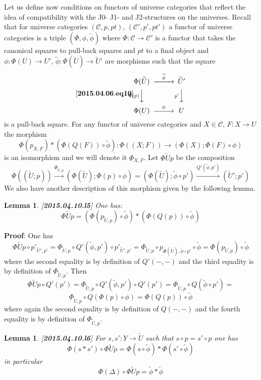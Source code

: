 \documentclass[12pt]{article}
\newenvironment{eq}{\begin{equation}}{\end{equation}}
\newenvironment{myproof}{{\bf Proof}:}{\vskip 5mm }
\newtheorem{lemma}[proposition]{Lemma}
\newcommand{\llabel}[1]{\label{#1}[{\bf #1}]}
\newcommand{\sr}{\rightarrow}
\newcommand{\lr}{\longrightarrow}
\newcommand{\wt}{\widetilde}
\begin{document}
Let us define now conditions on functors of universe categories that reflect the idea of compatibility with the J0- J1- and J2-structures on the universes. Recall that for universe categories $({\mathcal C},p,pt)$, $({\mathcal C}',p',pt')$ a functor of universe categories is a triple $(\Phi,\phi,\wt{\phi})$ where $\Phi:{\mathcal C}\sr {\mathcal C}'$ is a functor that takes the canonical squares to pull-back squares and $pt$ to a final object and $\phi:\Phi(U)\sr U'$, $\wt{\phi}:\Phi(\wt{U})\sr \wt{U}'$ are morphisms such that the square
%
\begin{eq}\llabel{2015.04.06.eq10}
\begin{CD}
\Phi(\wt{U}) @>\wt{\phi}>> \wt{U}'\\
@V\Phi(p) VV @Vp' VV\\
\Phi(U) @>\phi>> U
\end{CD}
\end{eq}
%
is a pull-back square. For any functor of universe categories and $X\in{\mathcal C}$, $F:X\sr U$ the morphism
%
$$\Phi(p_{X,F})*(\Phi(Q(F))\circ\wt{\phi}):\Phi((X;F))\sr (\Phi(X);\Phi(F)\circ\phi)$$
%
is an isomorphism and we will denote it $\Phi_{X,F}$. Let $\Phi\wt{U}p$ be the composition
%
$$\Phi((\wt{U};p)) \stackrel{\Phi_{\wt{U},p}}{\lr} (\Phi(\wt{U});\Phi(p)\circ \phi)=(\Phi(\wt{U});\wt{\phi}\circ p')\stackrel{Q'(\wt{\phi},p')}{\lr} (\wt{U}';p')$$
%
We also have another description of this morphism given by the following lemma.
%
\begin{lemma}
\llabel{2015.04.10.l5}
One has:
%
$$\Phi\wt{U}p=(\Phi(p_{\wt{U},p})\circ\wt{\phi})*(\Phi(Q(p))\circ\wt{\phi})$$
%
\end{lemma}
%
\begin{myproof}
One has
%
$$\Phi\wt{U}p\circ p'_{\wt{U}',p'}=\Phi_{\wt{U},p}\circ Q'(\wt{\phi},p')\circ p'_{\wt{U}',p'} =\Phi_{\wt{U},p}\circ p_{\Phi(\wt{U}),\wt{\phi}\circ p'}\circ\wt{\phi}=\Phi(p_{\wt{U},p})\circ \wt{\phi}$$
%
where the second equality is by definition of $Q'(-,-)$ and the third equality is by definition of $\Phi_{\wt{U},p}$. Then
%
$$\Phi\wt{U}p\circ Q'(p')=\Phi_{\wt{U},p}\circ Q'(\wt{\phi},p')\circ Q'(p')=\Phi_{\wt{U},p}\circ Q(\wt{\phi}\circ p')=$$$$\Phi_{\wt{U},p}\circ Q(\Phi(p)\circ \phi)=\Phi(Q(p))\circ \wt{\phi}$$
%
where again the second equality is by definition of $Q(-,-)$ and the fourth equality is by definition of $\Phi_{\wt{U},p}$. 
\end{myproof}
%
\begin{lemma}
\llabel{2015.04.10.l6}
For $s,s':Y\sr \wt{U}$ such that $s\circ p=s'\circ p$ one has
%
$$\Phi(s*s')\circ\Phi\wt{U}p=\Phi(s\circ \wt{\phi})*\Phi(s'\circ\wt{\phi})$$
%
in particular
%
$$\Phi(\Delta)\circ \Phi\wt{U}p = \wt{\phi}*\wt{\phi}$$
%
\end{lemma}
\end{document}
